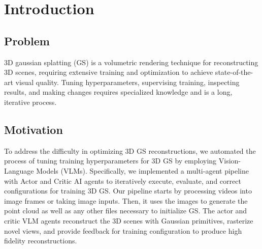 \section{Introduction}
\label{sec:introduction}

\subsection{Problem}
3D gaussian splatting (GS) is a volumetric rendering technique for reconstructing 3D scenes, requiring extensive training and optimization to achieve state-of-the-art visual quality. Tuning hyperparameters, supervising training, inspecting results, and making changes requires specialized knowledge and is a long, iterative process.

\subsection{Motivation}
To address the difficulty in optimizing 3D GS reconstructions, we automated the process of tuning training hyperparameters for 3D GS by employing Vision-Language Models (VLMs). Specifically, we implemented a multi-agent pipeline with Actor and Critic AI agents to iteratively execute, evaluate, and correct configurations for training 3D GS. Our pipeline starts by processing videos into image frames or taking image inputs. Then, it uses the images to generate the point cloud as well as any other files necessary to initialize GS. The actor and critic VLM agents reconstruct the 3D scenes with Gaussian primitives, rasterize novel views, and provide feedback for training configuration to produce high fidelity reconstructions.
